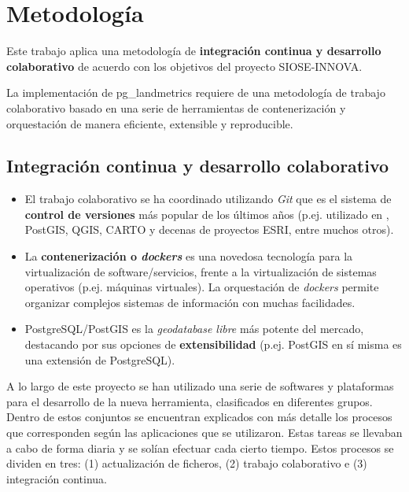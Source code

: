 

\chapter{Metodología}\label{chap:metod}

Este trabajo aplica una metodología de \textbf{integración continua y desarrollo colaborativo} de acuerdo con los objetivos del proyecto SIOSE-INNOVA.

La implementación de pg\_landmetrics requiere de una metodología de trabajo colaborativo basado en una serie de herramientas de contenerización y orquestación de manera eficiente, extensible y reproducible.


\section{Integración continua y desarrollo colaborativo}

\begin{graybox}
\begin{itemize}
\item El trabajo colaborativo se ha coordinado utilizando \textit{Git} que es el sistema de \textbf{control de versiones} más popular de los últimos años (p.ej. utilizado en , PostGIS, QGIS, CARTO y decenas de proyectos ESRI, entre muchos otros).
\item La \textbf{contenerización o \textit{dockers}} es una novedosa tecnología para la virtualización de software/servicios, frente a la virtualización de sistemas operativos (p.ej. máquinas virtuales). La orquestación de \textit{dockers} permite organizar complejos sistemas de información con muchas facilidades.
\item PostgreSQL/PostGIS es la \textit{geodatabase libre} más potente del mercado, destacando por sus opciones de \textbf{extensibilidad} (p.ej. PostGIS en sí misma es una extensión de PostgreSQL).
\end{itemize}
\end{graybox}

A lo largo de este proyecto se han utilizado una serie de softwares y plataformas para el desarrollo de la nueva herramienta, clasificados en diferentes grupos. Dentro de estos conjuntos se encuentran explicados con más detalle los procesos que corresponden según las aplicaciones que se utilizaron.  Estas tareas se llevaban a cabo de forma diaria y se solían efectuar cada cierto tiempo. Estos procesos se dividen en tres: (1) actualización de ficheros, (2) trabajo colaborativo e (3) integración continua.

